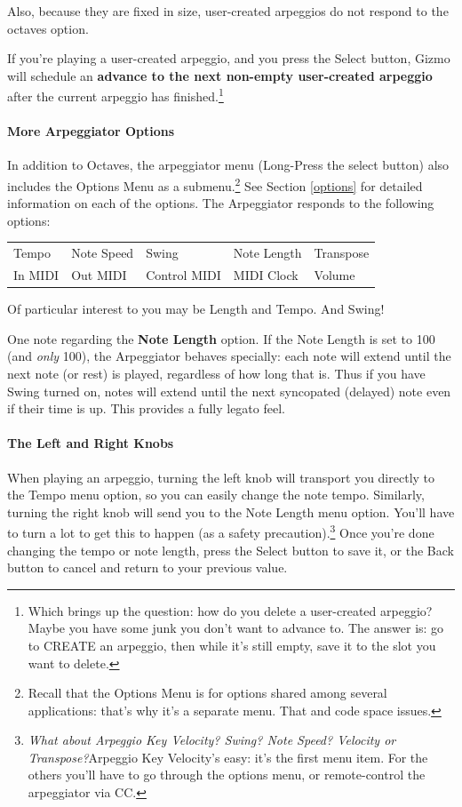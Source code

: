 \documentclass{article}
\newcommand\bump{\vspace{11in}}
\begin{document}
Also, because they are fixed in size, user-created arpeggios do not respond to the octaves option.

If you're playing a user-created arpeggio, and you press the Select button, Gizmo will schedule an {\bf advance to the next non-empty user-created arpeggio} after the current arpeggio has finished.\footnote{Which brings up the question: how do you delete a user-created arpeggio?  Maybe you have some junk you don't want to advance to.  The answer is: go to CREATE an arpeggio, then while it's still empty, save it to the slot you want to delete.}

\bump

\paragraph{More Arpeggiator Options}

In addition to Octaves, the arpeggiator menu (Long-Press the select button) also includes the Options Menu as a submenu.\footnote{Recall that the Options Menu is for options shared among several applications: that's why it's a separate menu.  That and code space issues.}  See Section \ref{options} for detailed information on each of the options.  The Arpeggiator responds to the following options:

\vspace{0.75em}
\begin{tabular}{lllll}
Tempo& Note Speed& Swing & Note Length&Transpose\\
In MIDI& Out MIDI&Control MIDI&MIDI Clock&Volume\\
\end{tabular}

\vspace{0.75em}
Of particular interest to you may be Length and Tempo.  And Swing!

One note regarding the {\bf Note Length} option.  If the Note Length is set to 100 (and {\it only} 100), the Arpeggiator behaves specially: each note will extend until the next note (or rest) is played, regardless of how long that is.  Thus if you have Swing turned on, notes will extend until the next syncopated (delayed) note even if their time is up. This provides a fully legato feel.


\paragraph{The Left and Right Knobs}  When playing an arpeggio, turning the left knob will transport you directly to the Tempo menu option, so you can easily change the note tempo.  Similarly, turning the right knob will send you to the Note Length menu option.  You'll have to turn a lot to get this to happen (as a safety precaution).\footnote{{\it What about Arpeggio Key Velocity?  Swing?  Note Speed? Velocity or Transpose?}\qquad Arpeggio Key Velocity's easy: it's the first menu item.  For the others you'll have to go through the options menu, or remote-control the arpeggiator via CC.}  Once you're done changing the tempo or note length, press the Select button to save it, or the Back button to cancel and return to your previous value.
\end{document}
